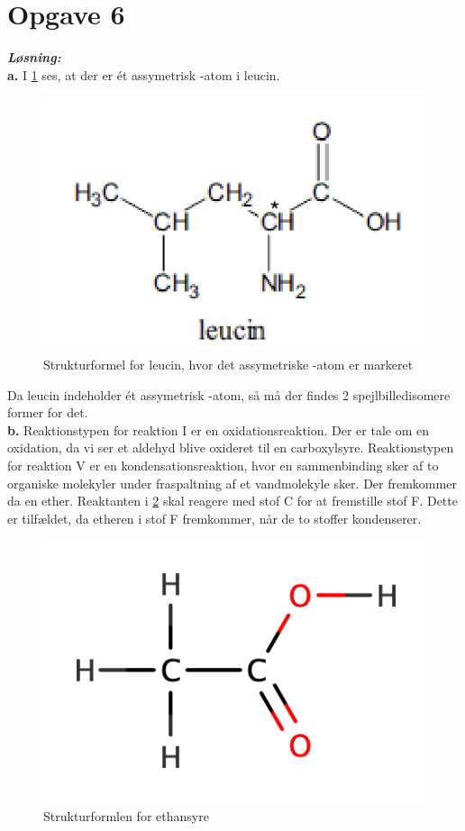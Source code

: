 \documentclass{report}
\newcommand{\sol}{\setlength{\parindent}{0cm}\textbf{\textit{Løsning:}}\setlength{\parindent}{1cm}}
\begin{document}
\section*{Opgave 6}
\sol \\
\textbf{a.}
I \cref{fig:leucin} ses, at der er ét assymetrisk -atom i leucin.
\begin{figure}[H]
\begin{center}
  \includegraphics[scale=1]{leucin.png}
\end{center}
\caption{Strukturformel for leucin, hvor det assymetriske -atom er markeret}
\label{fig:leucin}
\end{figure}
Da leucin indeholder ét assymetrisk -atom, så må der findes 2 spejlbilledisomere former for det.\\[1ex]
\textbf{b.}
Reaktionstypen for reaktion I er en oxidationsreaktion.
Der er tale om en oxidation, da vi ser et aldehyd blive oxideret til en carboxylsyre.
Reaktionstypen for reaktion V er en kondensationsreaktion, hvor en sammenbinding sker af to organiske molekyler under fraspaltning af et vandmolekyle sker.
Der fremkommer da en ether.
Reaktanten i \cref{fig:reaktant} skal reagere med stof C for at fremstille stof F.
Dette er tilfældet, da etheren i stof F fremkommer, når de to stoffer kondenserer.
\begin{figure}[H]
\begin{center}
  \includegraphics[scale=1]{reaktant.png}
\end{center}
\caption{Strukturformlen for ethansyre}
\label{fig:reaktant}
\end{figure}
\end{document}
